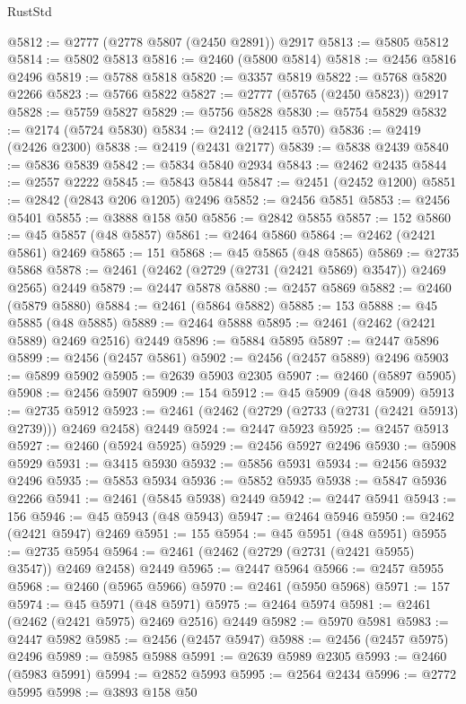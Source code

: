 \begin{lexlean}{RustStd}
\begin{coremodule}
@5812 := @2777 (@2778 @5807 (@2450 @2891)) @2917
@5813 := @5805 @5812
@5814 := @5802 @5813
@5816 := @2460 (@5800 @5814)
@5818 := @2456 @5816 @2496
@5819 := @5788 @5818
@5820 := @3357 @5819
@5822 := @5768 @5820 @2266
@5823 := @5766 @5822
@5827 := @2777 (@5765 (@2450 @5823)) @2917
@5828 := @5759 @5827
@5829 := @5756 @5828
@5830 := @5754 @5829
@5832 := @2174 (@5724 @5830)
@5834 := @2412 (@2415 @570)
@5836 := @2419 (@2426 @2300)
@5838 := @2419 (@2431 @2177)
@5839 := @5838 @2439
@5840 := @5836 @5839
@5842 := @5834 @5840 @2934
@5843 := @2462 @2435
@5844 := @2557 @2222
@5845 := @5843 @5844
@5847 := @2451 (@2452 @1200)
@5851 := @2842 (@2843 @206 @1205) @2496
@5852 := @2456 @5851
@5853 := @2456 @5401
@5855 := @3888 @158 @50
@5856 := @2842 @5855
@5857 := 152
@5860 := @45 @5857 (@48 @5857)
@5861 := @2464 @5860
@5864 := @2462 (@2421 @5861) @2469
@5865 := 151
@5868 := @45 @5865 (@48 @5865)
@5869 := @2735 @5868
@5878 := @2461 (@2462 (@2729 (@2731 (@2421 @5869) @3547)) @2469 @2565) @2449
@5879 := @2447 @5878
@5880 := @2457 @5869
@5882 := @2460 (@5879 @5880)
@5884 := @2461 (@5864 @5882)
@5885 := 153
@5888 := @45 @5885 (@48 @5885)
@5889 := @2464 @5888
@5895 := @2461 (@2462 (@2421 @5889) @2469 @2516) @2449
@5896 := @5884 @5895
@5897 := @2447 @5896
@5899 := @2456 (@2457 @5861)
@5902 := @2456 (@2457 @5889) @2496
@5903 := @5899 @5902
@5905 := @2639 @5903 @2305
@5907 := @2460 (@5897 @5905)
@5908 := @2456 @5907
@5909 := 154
@5912 := @45 @5909 (@48 @5909)
@5913 := @2735 @5912
@5923 := @2461 (@2462 (@2729 (@2733 (@2731 (@2421 @5913) @2739))) @2469 @2458) @2449
@5924 := @2447 @5923
@5925 := @2457 @5913
@5927 := @2460 (@5924 @5925)
@5929 := @2456 @5927 @2496
@5930 := @5908 @5929
@5931 := @3415 @5930
@5932 := @5856 @5931
@5934 := @2456 @5932 @2496
@5935 := @5853 @5934
@5936 := @5852 @5935
@5938 := @5847 @5936 @2266
@5941 := @2461 (@5845 @5938) @2449
@5942 := @2447 @5941
@5943 := 156
@5946 := @45 @5943 (@48 @5943)
@5947 := @2464 @5946
@5950 := @2462 (@2421 @5947) @2469
@5951 := 155
@5954 := @45 @5951 (@48 @5951)
@5955 := @2735 @5954
@5964 := @2461 (@2462 (@2729 (@2731 (@2421 @5955) @3547)) @2469 @2458) @2449
@5965 := @2447 @5964
@5966 := @2457 @5955
@5968 := @2460 (@5965 @5966)
@5970 := @2461 (@5950 @5968)
@5971 := 157
@5974 := @45 @5971 (@48 @5971)
@5975 := @2464 @5974
@5981 := @2461 (@2462 (@2421 @5975) @2469 @2516) @2449
@5982 := @5970 @5981
@5983 := @2447 @5982
@5985 := @2456 (@2457 @5947)
@5988 := @2456 (@2457 @5975) @2496
@5989 := @5985 @5988
@5991 := @2639 @5989 @2305
@5993 := @2460 (@5983 @5991)
@5994 := @2852 @5993
@5995 := @2564 @2434
@5996 := @2772 @5995
@5998 := @3893 @158 @50

\end{coremodule}
\end{lexlean}
